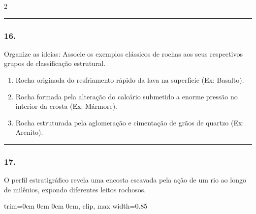 \documentclass[twoside, 10pt, a4paper]{article}
\newlength{\espacoPreQuestao}
\newlength{\espacoQuestao}
\newlength{\espacoAlt}
\newcommand{\larguraTikz}{0.85\linewidth}
\begin{document}
\begin{multicols*}{2}
\noindent\textcolor{CorLinha}{\rule{\linewidth}{0.5pt}} 
\par\vspace{\espacoPreQuestao}
\subsubsection*{16.} Organize as ideias: Associe os exemplos clássicos de rochas aos seus respectivos grupos de classificação estrutural.

\begin{enumerate}[label=\Roman*., itemsep=\espacoAlt]
\item Rocha originada do resfriamento rápido da lava na superfície (Ex: Basalto).
\item Rocha formada pela alteração do calcário submetido a enorme pressão no interior da crosta (Ex: Mármore).
\item Rocha estruturada pela aglomeração e cimentação de grãos de quartzo (Ex: Arenito).
\end{enumerate}
\par\vspace{\espacoQuestao}

\noindent\textcolor{CorLinha}{\rule{\linewidth}{0.5pt}} 
\par\vspace{\espacoPreQuestao}
\subsubsection*{17.} O perfil estratigráfico revela uma encosta escavada pela ação de um rio ao longo de milênios, expondo diferentes leitos rochosos.

\begin{center}
\begin{adjustbox}{trim=0cm 0cm 0cm 0cm, clip, max width=\larguraTikz}
\end{adjustbox}
\end{center}
\end{multicols*}
\end{document}
